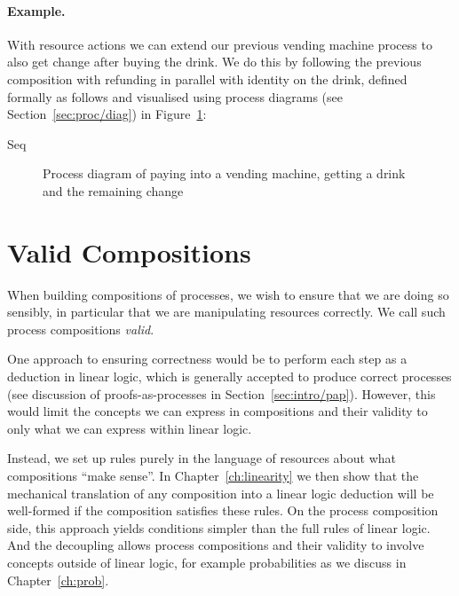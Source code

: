 \documentclass[class=smolathesis,crop=false]{standalone}
\begin{document}
\paragraph*{Example.}
With resource actions we can extend our previous vending machine process to also get change after buying the drink.
We do this by following the previous composition with refunding in parallel with identity on the drink, defined formally as follows and visualised using process diagrams (see Section~\ref{sec:proc/diag}) in Figure~\ref{fig:pay_drink_change}:
\begin{isabelle}
\centering
  Seq\ \ 
\end{isabelle}

\begin{figure}[htbp]
  
  \caption{Process diagram of paying into a vending machine, getting a drink and the remaining change}
  \label{fig:pay_drink_change}
\end{figure}

\section{Valid Compositions}
\label{sec:proc/valid}

When building compositions of processes, we wish to ensure that we are doing so sensibly, in particular that we are manipulating resources correctly.
We call such process compositions \emph{valid}.

One approach to ensuring correctness would be to perform each step as a deduction in linear logic, which is generally accepted to produce correct processes (see discussion of proofs-as-processes in Section~\ref{sec:intro/pap}).
However, this would limit the concepts we can express in compositions and their validity to only what we can express within linear logic.

Instead, we set up rules purely in the language of resources about what compositions ``make sense''.
In Chapter~\ref{ch:linearity} we then show that the mechanical translation of any composition into a linear logic deduction will be well-formed if the composition satisfies these rules.
On the process composition side, this approach yields conditions simpler than the full rules of linear logic.
And the decoupling allows process compositions and their validity to involve concepts outside of linear logic, for example probabilities as we discuss in Chapter~\ref{ch:prob}.
\end{document}
